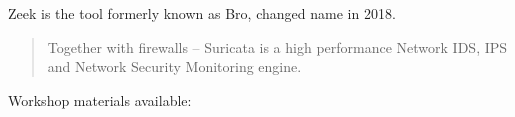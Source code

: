 \documentclass[Screen16to9,17pt]{foils}
\begin{document}
Zeek is the tool formerly known as Bro, changed name in 2018. 




\begin{quote}
Together with firewalls -- Suricata is a high performance Network IDS, IPS and Network Security Monitoring engine.
\end{quote}


Workshop materials available:\\
{\small{}}
\end{document}
